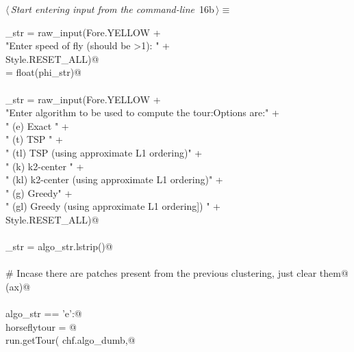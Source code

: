 \documentclass[12pt]{report}
\begin{document}
\begin{flushleft} \small\label{scrap5}\raggedright\small
{} $\langle\,${\itshape Start entering input from the command-line}\nobreak\ {\footnotesize {16b}}$\,\rangle\equiv$
\vspace{-1ex}
\begin{list}{}{} \item
\mbox{}\verb@phi_str = raw_input(Fore.YELLOW + \@\\
\mbox{}\verb@          "Enter speed of fly (should be >1): " +\@\\
\mbox{}\verb@           Style.RESET_ALL)@\\
\mbox{}\verb@phi = float(phi_str)@\\
\mbox{}\verb@@\\
\mbox{}\verb@algo_str = raw_input(Fore.YELLOW + \@\\
\mbox{}\verb@          "Enter algorithm to be used to compute the tour:\n Options are:\n" +\@\\
\mbox{}\verb@        "  (e)   Exact \n"                                   +\@\\
\mbox{}\verb@        "  (t)   TSP   \n"                                   +\@\\
\mbox{}\verb@        "  (tl)  TSP   (using approximate L1 ordering)\n"    +\@\\
\mbox{}\verb@        "  (k)   k2-center   \n"                             +\@\\
\mbox{}\verb@        "  (kl)  k2-center (using approximate L1 ordering)\n"  +\@\\
\mbox{}\verb@        "  (g)   Greedy\n"                                   +\@\\
\mbox{}\verb@        "  (gl) Greedy (using approximate L1 ordering])  "  +\@\\
\mbox{}\verb@        Style.RESET_ALL)@\\
\mbox{}\verb@@\\
\mbox{}\verb@algo_str = algo_str.lstrip()@\\
\mbox{}\verb@@\\
\mbox{}\verb@# Incase there are patches present from the previous clustering, just clear them@\\
\mbox{}\verb@clearAxPolygonPatches(ax)@\\
\mbox{}\verb@@\\
\mbox{}\verb@if   algo_str == 'e':@\\
\mbox{}\verb@      horseflytour = @\\
\mbox{}\verb@             run.getTour( chf.algo_dumb,@\\

\end{list}
\end{flushleft}
\end{document}
